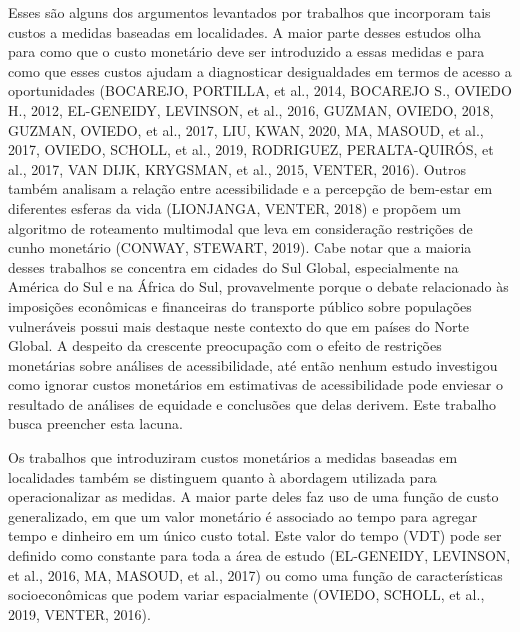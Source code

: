 \documentclass[msc,numbers]{coppe}
\begin{document}
  Esses são alguns dos argumentos levantados por trabalhos que incorporam tais custos a medidas baseadas em localidades. A maior parte desses estudos olha para como que o custo monetário deve ser introduzido a essas medidas e para como que esses custos ajudam a diagnosticar desigualdades em termos de acesso a oportunidades (BOCAREJO, PORTILLA, et al., 2014, BOCAREJO S., OVIEDO H., 2012, EL-GENEIDY, LEVINSON, et al., 2016, GUZMAN, OVIEDO, 2018, GUZMAN, OVIEDO, et al., 2017, LIU, KWAN, 2020, MA, MASOUD, et al., 2017, OVIEDO, SCHOLL, et al., 2019, RODRIGUEZ, PERALTA-QUIRÓS, et al., 2017, VAN DIJK, KRYGSMAN, et al., 2015, VENTER, 2016). Outros também analisam a relação entre acessibilidade e a percepção de bem-estar em diferentes esferas da vida (LIONJANGA, VENTER, 2018) e propõem um algoritmo de roteamento multimodal que leva em consideração restrições de cunho monetário (CONWAY, STEWART, 2019). Cabe notar que a maioria desses trabalhos se concentra em cidades do Sul Global, especialmente na América do Sul e na África do Sul, provavelmente porque o debate relacionado às imposições econômicas e financeiras do transporte público sobre populações vulneráveis possui mais destaque neste contexto do que em países do Norte Global. A despeito da crescente preocupação com o efeito de restrições monetárias sobre análises de acessibilidade, até então nenhum estudo investigou como ignorar custos monetários em estimativas de acessibilidade pode enviesar o resultado de análises de equidade e conclusões que delas derivem. Este trabalho busca preencher esta lacuna.

  Os trabalhos que introduziram custos monetários a medidas baseadas em localidades também se distinguem quanto à abordagem utilizada para operacionalizar as medidas. A maior parte deles faz uso de uma função de custo generalizado, em que um valor monetário é associado ao tempo para agregar tempo e dinheiro em um único custo total. Este valor do tempo (VDT) pode ser definido como constante para toda a área de estudo (EL-GENEIDY, LEVINSON, et al., 2016, MA, MASOUD, et al., 2017) ou como uma função de características socioeconômicas que podem variar espacialmente (OVIEDO, SCHOLL, et al., 2019, VENTER, 2016).
\end{document}
